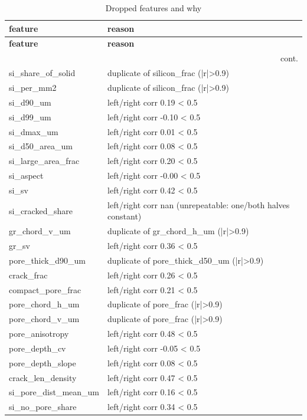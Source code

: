 \documentclass[11pt,a4paper]{article}
\begin{document}
\begin{longtable}{lp{10cm}}
\caption{Dropped features and why}\label{tab:dropped}\\
\toprule
\textbf{feature} & \textbf{reason} \\
\midrule
\endfirsthead
\toprule \textbf{feature} & \textbf{reason} \\
\midrule
\endhead
\midrule\multicolumn{2}{r}{\footnotesize cont.}\\\midrule\endfoot
\bottomrule\endlastfoot
si\_share\_of\_solid & duplicate of silicon\_frac (|r|>0.9) \\
si\_per\_mm2 & duplicate of silicon\_frac (|r|>0.9) \\
si\_d90\_um & left/right corr 0.19 < 0.5 \\
si\_d99\_um & left/right corr -0.10 < 0.5 \\
si\_dmax\_um & left/right corr 0.01 < 0.5 \\
si\_d50\_area\_um & left/right corr 0.08 < 0.5 \\
si\_large\_area\_frac & left/right corr 0.20 < 0.5 \\
si\_aspect & left/right corr -0.00 < 0.5 \\
si\_sv & left/right corr 0.42 < 0.5 \\
si\_cracked\_share & left/right corr nan (unrepeatable: one/both halves constant) \\
gr\_chord\_v\_um & duplicate of gr\_chord\_h\_um (|r|>0.9) \\
gr\_sv & left/right corr 0.36 < 0.5 \\
pore\_thick\_d90\_um & duplicate of pore\_thick\_d50\_um (|r|>0.9) \\
crack\_frac & left/right corr 0.26 < 0.5 \\
compact\_pore\_frac & left/right corr 0.21 < 0.5 \\
pore\_chord\_h\_um & duplicate of pore\_frac (|r|>0.9) \\
pore\_chord\_v\_um & duplicate of pore\_frac (|r|>0.9) \\
pore\_anisotropy & left/right corr 0.48 < 0.5 \\
pore\_depth\_cv & left/right corr -0.05 < 0.5 \\
pore\_depth\_slope & left/right corr 0.08 < 0.5 \\
crack\_len\_density & left/right corr 0.47 < 0.5 \\
si\_pore\_dist\_mean\_um & left/right corr 0.16 < 0.5 \\
si\_no\_pore\_share & left/right corr 0.34 < 0.5 \\

\end{longtable}
\end{document}
